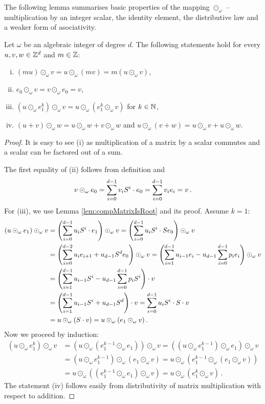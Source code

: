 The following lemma summarises basic properties of the mapping $\odot_\omega$ -- multiplication by an integer scalar, the identity element, the distributive law and a weaker form of asociativity.
\begin{lem}
\label{lem:multInZd}
Let $\omega$ be an algebraic integer of degree $d$. The following statements hold for every $u,v,w\in \mathbb{Z}^d$ and $m\in\mathbb{Z}$:
\begin{enumerate}[(i)]
    \item $(mu)\odot_\omega v = u \odot_\omega (m v)= m (u\odot_\omega v)$,
    \item $e_0 \odot_\omega v= v \odot_\omega e_0 =v$,
    \item $(u \odot_\omega e_1^k)\odot_\omega v = u \odot_\omega (e_1^k\odot_\omega v)$ for $k\in\mathbb{N}$,
    \item $(u+v)\odot_\omega w =u\odot_\omega w + v\odot_\omega w$ and $u \odot_\omega (v+w)= u \odot_\omega v +u\odot_\omega w$.
\end{enumerate}
\end{lem}
\begin{proof}
It is easy to see (i) as multiplication of a matrix by a scalar commutes and a scalar can be factored out of a sum. 

The first equality of (ii) follows from definition and
$$
v \odot_\omega e_0=\sum_{i=0}^{d-1} {v}_i S^i\cdot e_0= \sum_{i=0}^{d-1} v_i e_i = v\,.
$$
For (iii), we use Lemma \ref{lem:compMatrixIsRoot} and its proof. Assume $k=1$:
\begin{align*}
(u \odot_\omega e_1)\odot_\omega v &= \left(\sum_{i=0}^{d-1} {u}_i S^i \cdot e_1\right) \odot_\omega v = \left(\sum_{i=0}^{d-1} {u}_i S^i \cdot S e_0\right) \odot_\omega v \\
    &=\left(\sum_{i=0}^{d-2}u_i e_{i+1} + u_{d-1} S^d e_{0} \right)\odot_\omega v= \left(\sum_{i=1}^{d-1}u_{i-1} e_{i} - u_{d-1} \sum_{i=0}^{d-1} p_i e_{i} \right)\odot_\omega v \\
    &=\left(\sum_{i=1}^{d-1}u_{i-1}S^i - u_{d-1} \sum_{i=0}^{d-1}p_i S^i \right)\cdot v \\
    &=\left(\sum_{i=1}^{d-1}u_{i-1}S^i  + u_{d-1}S^d\right)\cdot v =\sum_{i=0}^{d-1}u_{i}S^i\cdot S\cdot v \\
    &=u \odot_\omega (S\cdot v)=u \odot_\omega (e_1\odot_\omega v)\,.
\end{align*}
Now we proceed by induction:
\begin{align*}
\left(u \odot_\omega e_1^k\right)\odot_\omega v &=\left(u \odot_\omega (e_1^{k-1}\odot_\omega e_1) \right)\odot_\omega v = \left((u \odot_\omega e_1^{k-1})\odot_\omega e_1 \right)\odot_\omega v \\
    &= (u \odot_\omega e_1^{k-1})\odot_\omega \left(e_1 \odot_\omega v \right)= u \odot_\omega \left( e_1^{k-1}\odot_\omega (e_1 \odot_\omega v )\right)\\
    &= u \odot_\omega \left(( e_1^{k-1}\odot_\omega e_1 )\odot_\omega v \right) = u \odot_\omega \left(e_1^k\odot_\omega v\right)\,.
\end{align*}
The statement (iv) follows easily from distributivity of matrix multiplication with respect to addition. 
\end{proof}




